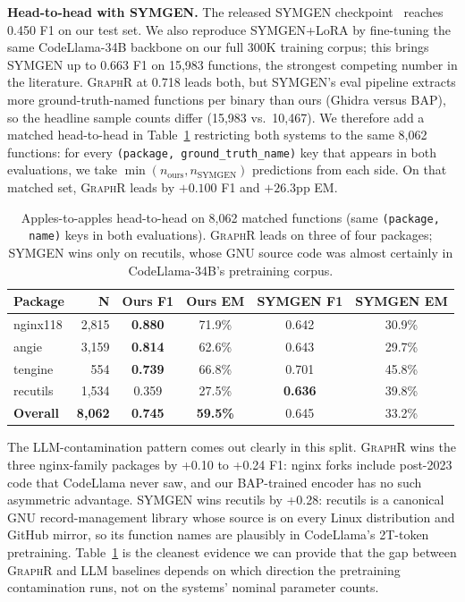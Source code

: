 \documentclass[sigconf,nonacm]{acmart}
\newcommand{\sysname}{\textsc{GraphR}}
\begin{document}
\textbf{Head-to-head with SYMGEN.} The released SYMGEN checkpoint~\cite{symgen} reaches 0.450 F1 on our test set. We also reproduce SYMGEN+LoRA by fine-tuning the same CodeLlama-34B backbone on our full 300K training corpus; this brings SYMGEN up to 0.663 F1 on 15{,}983 functions, the strongest competing number in the literature. \sysname{} at 0.718 leads both, but SYMGEN's eval pipeline extracts more ground-truth-named functions per binary than ours (Ghidra versus BAP), so the headline sample counts differ (15{,}983 vs.\ 10{,}467). We therefore add a matched head-to-head in Table~\ref{tab:matched} restricting both systems to the same 8{,}062 functions: for every \texttt{(package, ground\_truth\_name)} key that appears in both evaluations, we take $\min(n_{\text{ours}}, n_{\text{SYMGEN}})$ predictions from each side. On that matched set, \sysname{} leads by $+0.100$ F1 and $+26.3$pp EM.

\begin{table}[t]
    \centering
    \caption{Apples-to-apples head-to-head on 8{,}062 matched functions (same \texttt{(package, name)} keys in both evaluations). \sysname{} leads on three of four packages; SYMGEN wins only on recutils, whose GNU source code was almost certainly in CodeLlama-34B's pretraining corpus.}
    \label{tab:matched}
    \footnotesize
    \begin{tabular}{lrcccc}
        \toprule
        \textbf{Package} & \textbf{N} & \textbf{Ours F1} & \textbf{Ours EM} & \textbf{SYMGEN F1} & \textbf{SYMGEN EM} \\
        \midrule
        nginx118 & 2{,}815 & \textbf{0.880} & 71.9\% & 0.642 & 30.9\% \\
        angie    & 3{,}159 & \textbf{0.814} & 62.6\% & 0.643 & 29.7\% \\
        tengine  &    554 & \textbf{0.739} & 66.8\% & 0.701 & 45.8\% \\
        recutils & 1{,}534 & 0.359 & 27.5\% & \textbf{0.636} & 39.8\% \\
        \midrule
        \textbf{Overall} & \textbf{8{,}062} & \textbf{0.745} & \textbf{59.5\%} & 0.645 & 33.2\% \\
        \bottomrule
    \end{tabular}
\end{table}

The LLM-contamination pattern comes out clearly in this split. \sysname{} wins the three nginx-family packages by +0.10 to +0.24 F1: nginx forks include post-2023 code that CodeLlama never saw, and our BAP-trained encoder has no such asymmetric advantage. SYMGEN wins recutils by +0.28: recutils is a canonical GNU record-management library whose source is on every Linux distribution and GitHub mirror, so its function names are plausibly in CodeLlama's 2T-token pretraining. Table~\ref{tab:matched} is the cleanest evidence we can provide that the gap between \sysname{} and LLM baselines depends on which direction the pretraining contamination runs, not on the systems' nominal parameter counts.
\end{document}

